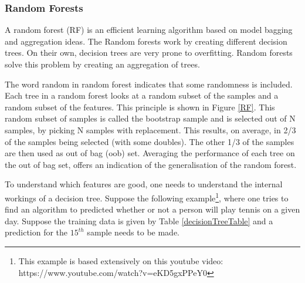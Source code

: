 
\subsubsection{Random Forests}
A random forest (RF)  is an efficient learning algorithm based on model bagging and aggregation ideas\citep{rfPaper}. The Random forests work by creating different decision trees. On their own, decision trees are very prone to overfitting. Random forests solve this problem by creating an aggregation of trees. 

\npar

The word random in random forest indicates that some randomness is included. Each tree in a random forest looks at a random subset of the samples and a random subset of the features. This principle is shown in Figure \ref{RF}. This random subset of samples is called the bootstrap sample and is selected out of N samples, by picking N samples with replacement. This results, on average, in 2/3 of the samples being selected (with some doubles). The other 1/3 of the samples are then used as out of bag (oob)  set. Averaging the performance of each tree on the out of bag set, offers an indication of the generalisation of the random forest.


To understand which features are good, one needs to understand the internal workings of a decision tree. Suppose the following example\footnote{This example is based extensively on this youtube video: https://www.youtube.com/watch?v=eKD5gxPPeY0}, where one tries to find an algorithm to predicted whether or not a person will play tennis on a given day. Suppose the training data is given by Table \ref{decisionTreeTable} and a prediction for the $15^{th}$ sample needs to be made.

